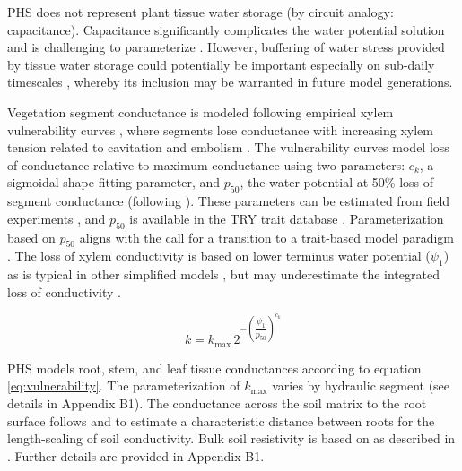 \documentclass[draft,linenumbers]{agujournal}
\begin{document}
    PHS does not represent plant tissue water storage (by circuit analogy: capacitance). 
    Capacitance significantly complicates the water potential solution \citep{celia1990} and is challenging to parameterize \citep{bartlett2016}.   
     However, buffering of water stress provided by tissue water storage could potentially be important especially on sub-daily timescales \citep{meinzer2009,epila2017}, whereby its inclusion may be warranted in future model generations.

     Vegetation segment conductance is modeled following empirical xylem vulnerability curves \citep{tyree1989}, 
     where segments lose conductance with increasing xylem tension related to 
     cavitation and embolism \citep{holbrook2001}.
     The vulnerability curves model loss of conductance relative to maximum conductance using two parameters: 
     $c_k$, a sigmoidal shape-fitting parameter, and 
     $p_{50}$, the water potential at 50\% loss of segment conductance (following \cite{gentine2016}). 
     These parameters can be estimated from field experiments \citep{sack2002}, 
     and $p_{50}$ is available in the TRY trait database \citep{kattge2011}.
     Parameterization based on $p_{50}$ aligns with the call for a transition to a
     trait-based model paradigm \citep{anderegg2015a}.
     The loss of xylem conductivity is based on lower terminus water potential ($\psi_1$)
     as is typical in other simplified models \citep{xu2016}, but 
     may underestimate the integrated loss of conductivity \citep{sperry2015}. 
         
     \begin{linenomath*}
     \begin{equation}
     \label{eq:vulnerability}
     k = k_{\text{max}} \, 2^{-\left(\dfrac{\psi_1}{p_{50}}\right)^{c_k}}
     \end{equation}
     \end{linenomath*}
     
     PHS models root, stem, and leaf tissue conductances according to equation \ref{eq:vulnerability}.
     The parameterization of $k_{\text{max}}$ varies by hydraulic segment (see details in Appendix B1).
     The conductance across the soil matrix to the root surface follows \citet{williams2001} and \citet{bonan2014} 
     to estimate a characteristic distance between roots for the length-scaling of soil conductivity.
     Bulk soil resistivity is based on \citet{clapp1978} as described in \citet{oleson2013}.
     Further details are provided in Appendix B1.
    
\end{document}
